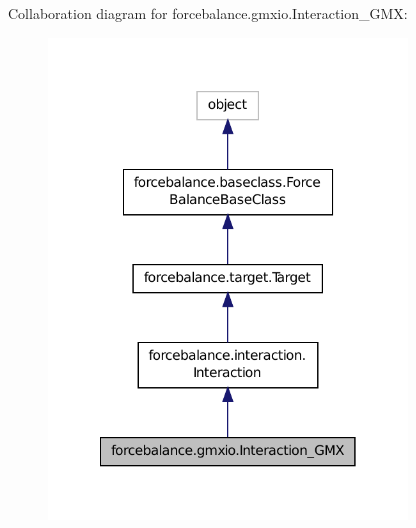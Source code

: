 Collaboration diagram for forcebalance.\-gmxio.\-Interaction\-\_\-\-G\-M\-X\-:\nopagebreak
\begin{figure}[H]
\begin{center}
\leavevmode
\includegraphics[width=270pt]{classforcebalance_1_1gmxio_1_1Interaction__GMX__coll__graph}
\end{center}
\end{figure}
